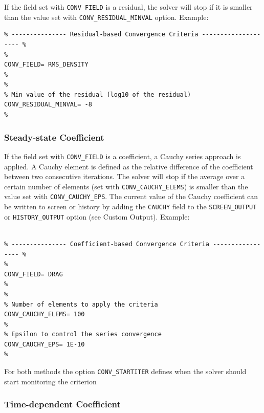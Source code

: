 \documentclass{article}
\begin{document}
If the field set with \verb|CONV_FIELD| is a residual, the solver will stop if it is smaller than the value set with \verb|CONV_RESIDUAL_MINVAL| option. Example:


\begin{lstlisting}
% --------------- Residual-based Convergence Criteria -------------------- %
%
CONV_FIELD= RMS_DENSITY
%
%
% Min value of the residual (log10 of the residual)
CONV_RESIDUAL_MINVAL= -8
%
\end{lstlisting}

\subsubsection{Steady-state Coefficient}

If the field set with \verb|CONV_FIELD| is a coefficient, a Cauchy series approach is applied. A Cauchy element is defined as the relative difference of the coefficient between two consecutive iterations. The solver will stop if the average over a certain number of elements (set with \verb|CONV_CAUCHY_ELEMS|) is smaller than the value set with \verb|CONV_CAUCHY_EPS|. The current value of the Cauchy coefficient can be written to screen or history by adding the \verb|CAUCHY| field to the \verb|SCREEN_OUTPUT| or \verb|HISTORY_OUTPUT| option (see Custom Output). Example:


\begin{lstlisting}

% --------------- Coefficient-based Convergence Criteria ----------------- %
%
CONV_FIELD= DRAG
%
%
% Number of elements to apply the criteria
CONV_CAUCHY_ELEMS= 100
%
% Epsilon to control the series convergence
CONV_CAUCHY_EPS= 1E-10
%

\end{lstlisting}
For both methods the option \verb|CONV_STARTITER| defines when the solver should start monitoring the criterion


\subsubsection{Time-dependent Coefficient}
\end{document}
